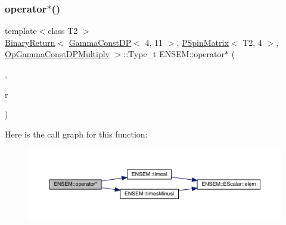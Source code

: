 \subsubsection{\texorpdfstring{operator$\ast$()}{operator*()}\hspace{0.1cm}{\footnotesize\ttfamily [44/64]}}
{\footnotesize\ttfamily template$<$class T2 $>$ \\
\mbox{\hyperlink{structENSEM_1_1BinaryReturn}{Binary\+Return}}$<$ \mbox{\hyperlink{classENSEM_1_1GammaConstDP}{Gamma\+Const\+DP}}$<$ 4, 11 $>$, \mbox{\hyperlink{classENSEM_1_1PSpinMatrix}{P\+Spin\+Matrix}}$<$ T2, 4 $>$, \mbox{\hyperlink{structENSEM_1_1OpGammaConstDPMultiply}{Op\+Gamma\+Const\+D\+P\+Multiply}} $>$\+::Type\+\_\+t E\+N\+S\+E\+M\+::operator$\ast$ (\begin{DoxyParamCaption}\item[{const \mbox{\hyperlink{classENSEM_1_1GammaConstDP}{Gamma\+Const\+DP}}$<$ 4, 11 $>$ \&}]{,  }\item[{const \mbox{\hyperlink{classENSEM_1_1PSpinMatrix}{P\+Spin\+Matrix}}$<$ T2, 4 $>$ \&}]{r }\end{DoxyParamCaption})\hspace{0.3cm}{\ttfamily [inline]}}

Here is the call graph for this function\+:\nopagebreak
\begin{figure}[H]
\begin{center}
\leavevmode
\includegraphics[width=350pt]{d6/df5/group__primspinmatrix_ga763e216e29f923dec37a54603419bb2c_cgraph}
\end{center}
\end{figure}
\mbox{\label{group__primspinmatrix_gac9db04966aafec7cc5029c5dc0e37d4d}} 
